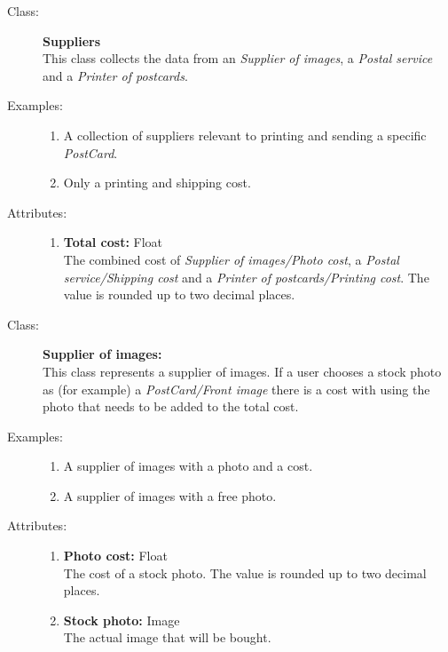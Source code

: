 \documentclass[10pt,a4paper]{article}
\begin{document}
\begin{description}
\item[Class:] \textbf{Suppliers} \hfill \\
This class collects the data from an \textit{Supplier of images}, a \textit{Postal service} and a \textit{Printer of postcards}. 

\item[Examples:] \hfill
\begin{enumerate}
\item A collection of suppliers relevant to printing and sending a specific \textit{PostCard}.
\item Only a printing and shipping cost.
\end{enumerate}

\item[Attributes:] \hfill
\begin{enumerate}
\item \textbf{Total cost:} Float \hfill \\The combined cost of \textit{Supplier of images/Photo cost}, a \textit{Postal service/Shipping cost} and a \textit{Printer of postcards/Printing cost}. The value is rounded up to two decimal places.
\end{enumerate}
\end{description}

\hrulefill

\begin{description}
\item[Class:] \textbf{Supplier of images:} \hfill \\
This class represents a supplier of images. If a user chooses a stock photo as (for example) a \textit{PostCard/Front image} there is a cost with using the photo that needs to be added to the total cost.

\item[Examples:] \hfill
\begin{enumerate}
\item A supplier of images with a photo and a cost.
\item A supplier of images with a free photo.
\end{enumerate}

\item[Attributes:] \hfill
\begin{enumerate}
\item \textbf{Photo cost:} Float \hfill \\The cost of a stock photo. The value is rounded up to two decimal places.
\item \textbf{Stock photo:} Image \hfill \\The actual image that will be bought.
\end{enumerate}
\end{description}
\end{document}

